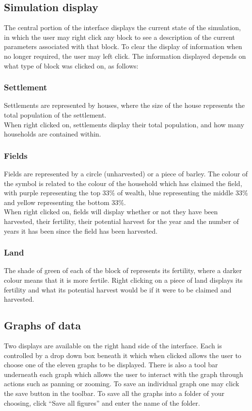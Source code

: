 \documentclass[12pt]{article}
\begin{document}
		\subsection{Simulation display}
			The central portion of the interface displays the current state of the simulation, in which the user may right click any block to see a description of the current parameters associated with that block. To clear the display of information when no longer required, the user may left click. The information displayed depends on what type of block was clicked on, as follows:
			\subsubsection{Settlement}
				Settlements are represented by houses, where the size of the house represents the total population of the settlement.\\
				When right clicked on, settlements display their total population, and how many households are contained within.\\
			\subsubsection{Fields}
				Fields are represented by a circle (unharvested) or a piece of barley. The colour of the symbol is related to the colour of the household which has claimed the field, with purple representing the top 33\% of wealth, blue representing the middle 33\% and yellow representing the bottom 33\%.\\
				When right clicked on, fields will display whether or not they have been harvested, their fertility, their potential harvest for the year and the number of years it has been since the field has been harvested.\\
			\subsubsection{Land}
				The shade of green of each of the block of represents its fertility, where a darker colour means that it is more fertile. Right clicking on a piece of land displays its fertility and what its potential harvest would be if it were to be claimed and harvested.
				
		\subsection{Graphs of data}
			Two displays are available on the right hand side of the interface. Each is controlled by a drop down box beneath it which when clicked allows the user to choose one of the eleven graphs to be displayed. There is also a tool bar underneath each graph which allows the user to interact with the graph through actions such as panning or zooming. To save an individual graph one may click the save button in the toolbar. To save all the graphs into a folder of your choosing, click “Save all figures” and enter the name of the folder. 
			
\end{document}
